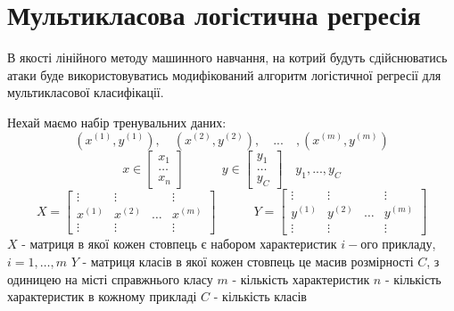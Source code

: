 \documentclass[a4paper,14pt]{extreport}
\begin{document}
	\section{Мультикласова логістична регресія}
	В якості лінійного методу машинного навчання, на котрий будуть сдійснюватись атаки буде використовуватись модифікований алгоритм логістичної регресії для мультикласової класифікації. \par
	Нехай маємо набір тренувальних даних:
	\begin{equation*}
		(x^{(1)}, y^{(1)}), \quad (x^{(2)}, y^{(2)}), \quad ... \quad ,(x^{(m)}, y^{(m)})
	\end{equation*}
	\begin{equation*}
		x \in
		\begin{bmatrix}
		x_1   \\
		\dots \\
		x_n
		\end{bmatrix}	
		\quad \quad \quad
		y \in
		\begin{bmatrix}
		y_1   \\
		\dots \\
		y_C
		\end{bmatrix}
		\quad
		y_1, ..., y_C
	\end{equation*}
	\begin{equation*}
		X =	
		\begin{bmatrix}
		\vdots  & \vdots  & & \vdots \\
		x^{(1)} & x^{(2)} &   \dots & x^{(m)}\\
		\vdots  & \vdots  & & \vdots
		\end{bmatrix}
		\quad \quad \quad
		Y =	
		\begin{bmatrix}
		\vdots  & \vdots  & & \vdots \\
		y^{(1)} & y^{(2)} &   \dots & y^{(m)}\\
		\vdots  & \vdots  & & \vdots
		\end{bmatrix}
	\end{equation*}
	\newline
	$X$ - матриця в якої кожен стовпець є набором характеристик $i-$ого прикладу, $i=1,\dots,m$ 
	\newline
	$Y$ - матриця класів в якої кожен стовпець це масив розмірності $C$, з одиницею на місті справжнього класу
	\newline
	$m$ - кількість характеристик
	\newline
	$n$ - кількість характеристик в кожному прикладі
	\newline
	$C$ - кількість класів
\end{document}
